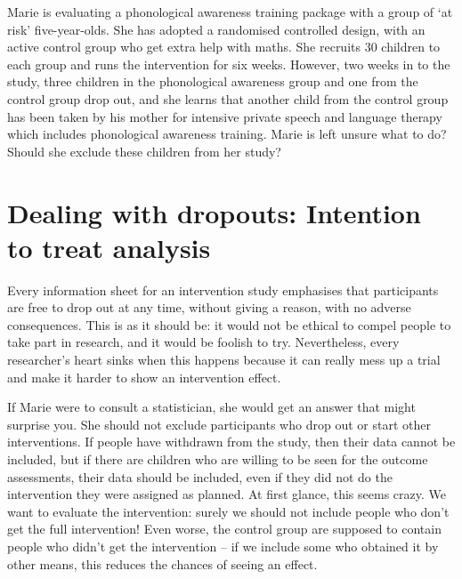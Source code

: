 \documentclass[]{book}
\begin{document}
Marie is evaluating a phonological awareness training package with a group of `at risk' five-year-olds. She has adopted a randomised controlled design, with an active control group who get extra help with maths. She recruits 30 children to each group and runs the intervention for six weeks. However, two weeks in to the study, three children in the phonological awareness group and one from the control group drop out, and she learns that another child from the control group has been taken by his mother for intensive private speech and language therapy which includes phonological awareness training. Marie is left unsure what to do? Should she exclude these children from her study?

\hypertarget{dealing-with-dropouts-intention-to-treat-analysis}{%
\section{Dealing with dropouts: Intention to treat analysis}\label{dealing-with-dropouts-intention-to-treat-analysis}}

Every information sheet for an intervention study emphasises that participants are free to drop out at any time, without giving a reason, with no adverse consequences. This is as it should be: it would not be ethical to compel people to take part in research, and it would be foolish to try. Nevertheless, every researcher's heart sinks when this happens because it can really mess up a trial and make it harder to show an intervention effect.

If Marie were to consult a statistician, she would get an answer that might surprise you. She should not exclude participants who drop out or start other interventions. If people have withdrawn from the study, then their data cannot be included, but if there are children who are willing to be seen for the outcome assessments, their data should be included, even if they did not do the intervention they were assigned as planned. At first glance, this seems crazy. We want to evaluate the intervention: surely we should not include people who don't get the full intervention! Even worse, the control group are supposed to contain people who didn't get the intervention -- if we include some who obtained it by other means, this reduces the chances of seeing an effect.
\end{document}
